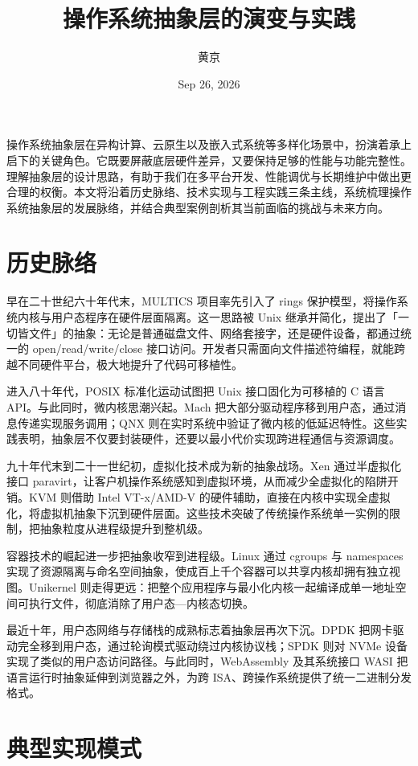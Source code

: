 \title{操作系统抽象层的演变与实践}
\author{黄京}
\date{Sep 26, 2026}
\maketitle
操作系统抽象层在异构计算、云原生以及嵌入式系统等多样化场景中，扮演着承上启下的关键角色。它既要屏蔽底层硬件差异，又要保持足够的性能与功能完整性。理解抽象层的设计思路，有助于我们在多平台开发、性能调优与长期维护中做出更合理的权衡。本文将沿着历史脉络、技术实现与工程实践三条主线，系统梳理操作系统抽象层的发展脉络，并结合典型案例剖析其当前面临的挑战与未来方向。\par
\chapter{历史脉络}
早在二十世纪六十年代末，MULTICS 项目率先引入了 rings 保护模型，将操作系统内核与用户态程序在硬件层面隔离。这一思路被 Unix 继承并简化，提出了「一切皆文件」的抽象：无论是普通磁盘文件、网络套接字，还是硬件设备，都通过统一的 open/read/write/close 接口访问。开发者只需面向文件描述符编程，就能跨越不同硬件平台，极大地提升了代码可移植性。\par
进入八十年代，POSIX 标准化运动试图把 Unix 接口固化为可移植的 C 语言 API。与此同时，微内核思潮兴起。Mach 把大部分驱动程序移到用户态，通过消息传递实现服务调用；QNX 则在实时系统中验证了微内核的低延迟特性。这些实践表明，抽象层不仅要封装硬件，还要以最小代价实现跨进程通信与资源调度。\par
九十年代末到二十一世纪初，虚拟化技术成为新的抽象战场。Xen 通过半虚拟化接口 paravirt，让客户机操作系统感知到虚拟环境，从而减少全虚拟化的陷阱开销。KVM 则借助 Intel VT-x/AMD-V 的硬件辅助，直接在内核中实现全虚拟化，将虚拟机抽象下沉到硬件层面。这些技术突破了传统操作系统单一实例的限制，把抽象粒度从进程级提升到整机级。\par
容器技术的崛起进一步把抽象收窄到进程级。Linux 通过 cgroups 与 namespaces 实现了资源隔离与命名空间抽象，使成百上千个容器可以共享内核却拥有独立视图。Unikernel 则走得更远：把整个应用程序与最小化内核一起编译成单一地址空间可执行文件，彻底消除了用户态—内核态切换。\par
最近十年，用户态网络与存储栈的成熟标志着抽象层再次下沉。DPDK 把网卡驱动完全移到用户态，通过轮询模式驱动绕过内核协议栈；SPDK 则对 NVMe 设备实现了类似的用户态访问路径。与此同时，WebAssembly 及其系统接口 WASI 把语言运行时抽象延伸到浏览器之外，为跨 ISA、跨操作系统提供了统一二进制分发格式。\par
\chapter{典型实现模式}
